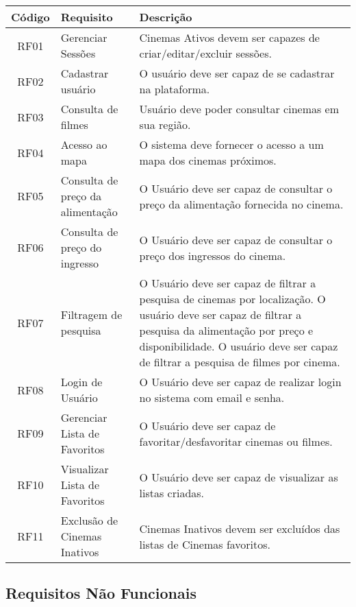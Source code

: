 \documentclass[
	article,			%
	12pt,				%
	oneside,			%
	a4paper,			%
	english,			%
	brazil,				%
	sumario=tradicional
	]{abntex2}
\begin{document}
\begin{tabular}{|c|l|p{6cm}|}
\hline
\textbf{Código} & \textbf{Requisito} & \textbf{Descrição} \\
\hline
RF01 & Gerenciar Sessões & Cinemas Ativos devem ser capazes de criar/editar/excluir sessões. \\
\hline
RF02 & Cadastrar usuário & O usuário deve ser capaz de se cadastrar na plataforma. \\
\hline
RF03 & Consulta de filmes & Usuário deve poder consultar cinemas em sua região. \\
\hline
RF04 & Acesso ao mapa & O sistema deve fornecer o acesso a um mapa dos cinemas próximos. \\
\hline
RF05 & Consulta de preço da alimentação & O Usuário deve ser capaz de consultar o preço da alimentação fornecida no cinema. \\
\hline
RF06 & Consulta de preço do ingresso & O Usuário deve ser capaz de consultar o preço dos ingressos do cinema. \\
\hline
RF07 & Filtragem de pesquisa & O Usuário deve ser capaz de filtrar a pesquisa de cinemas por localização. O usuário deve ser capaz de filtrar a pesquisa da alimentação por preço e disponibilidade. O usuário deve ser capaz de filtrar a pesquisa de filmes por cinema. \\
\hline
RF08 & Login de Usuário & O Usuário deve ser capaz de realizar login no sistema com email e senha. \\
\hline
RF09 & Gerenciar Lista de Favoritos & O Usuário deve ser capaz de favoritar/desfavoritar cinemas ou filmes. \\
\hline
RF10 & Visualizar Lista de Favoritos & O Usuário deve ser capaz de visualizar as listas criadas. \\
\hline
RF11 & Exclusão de Cinemas Inativos & Cinemas Inativos devem ser excluídos das listas de Cinemas favoritos. \\
\hline

\hline
\hline
\end{tabular}

\subsection{Requisitos Não Funcionais}
\end{document}
